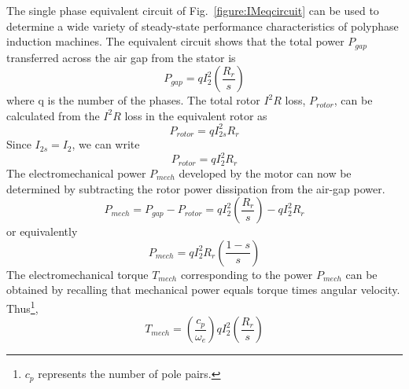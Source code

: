 \documentclass[12pt,a4paper,oneside]{book}
\begin{document}
\begin{onehalfspace}
The single phase equivalent circuit of Fig.~\ref{figure:IMeqcircuit} can be used to determine a wide variety of steady-state performance characteristics of polyphase induction machines. The equivalent circuit shows that the total power $P_{gap}$ transferred across the air gap from the stator is
\begin{equation} \label{eq12}
	P_{gap}= q I_2^2 \left( \frac{R_r}{s} \right)
\end{equation}
where q is the number of the phases.
The total rotor $I^2R$ loss, $P_{rotor}$, can be calculated from the $I^2R$ loss in the equivalent rotor as
\begin{equation} \label{eq13}
	P_{rotor}= q I_{2s}^2 R_r
\end{equation}
Since $I_{2s}=I_2$, we can write 
\begin{equation} \label{eq14}
	P_{rotor}= q I_{2}^2 R_r
\end{equation}
The electromechanical power $P_{mech}$ developed by the motor can now be determined by subtracting the rotor power dissipation from the air-gap power.
\begin{equation} \label{eq15}
	P_{mech} = P_{gap} - P_{rotor} = q I_{2}^2 \left( \frac{R_r}{s} \right) - q I_{2}^2 R_r
\end{equation} 
or equivalently
\begin{equation} \label{eq16}
	P_{mech} = q I_{2}^2 R_r \left( \frac{1-s}{s} \right)
\end{equation} 
The electromechanical torque $T_{mech}$ corresponding to the power $P_{mech}$ can be obtained by recalling that mechanical power equals torque times angular velocity. Thus\footnote{$c_p$ represents the number of pole pairs.},
\begin{equation} \label{eq17}
	T_{mech} = \left(\frac{c_p}{\omega_e} \right) q I_{2}^2 \left( \frac{R_r}{s} \right)
\end{equation} 


\end{onehalfspace}
\end{document}
